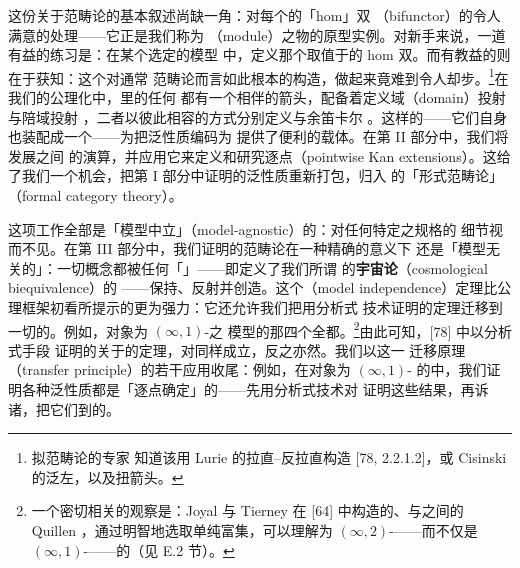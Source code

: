 这份关于\trInfinityCategory{}范畴论的基本叙述尚缺一角：对\trAdjunction{}每个\trInfinityCategory{}的「hom」双\trFunctor
（bifunctor）的令人满意的处理——它正是我们称为\textbf{\trModule}
（module）之物的原型实例。对新手来说，一道有益的练习是：在某个选定的模型
中，定义那个取值于\trInfinityGroupoid{}的 hom 双\trFunctor{}。而有教益的则在于获知：这个对通常
范畴论而言如此根本的构造，做起来竟难到令人却步。\footnote{拟范畴论的专家
知道该用 Lurie 的拉直–反拉直构造 [78, 2.2.1.2]，或 Cisinski 的泛左\trFibration
[28, 5.2.8]，以及扭箭头\trQuasiCategory{}。}在我们的公理化中，\trInfinityCosmos{}里的任何\trInfinityCategory
都有一个相伴的箭头\trInfinityCategory{}，配备着定义域（domain）投射\trFunctor{}与陪域投射%
\trFunctor{}，二者以彼此相容的方式分别定义\trCartesianFibration{}与余笛卡尔%
\trFibration{}。这样的\trModule——它们自身也装配成一个\trInfinityCosmos——为把泛性质编码为%
\trFibered{}\trEquivalence{}提供了便利的载体。在第 II 部分中，我们将发展\trInfinityCategory{}之间%
\trModule{}的演算，并应用它来定义和研究逐点\trKanExtension{}（pointwise Kan
extensions）。这给了我们一个机会，把第 I 部分中证明的泛性质重新打包，归入%
\trInfinityCategory{}的「形式范畴论」（formal category theory）。

这项工作全部是「模型中立」（model-agnostic）的：对任何特定\trInfinityCosmos{}之规格的
细节视而不见。在第 III 部分中，我们证明\trInfinityCategory{}的范畴论在一种精确的意义下
还是「模型无关的」：一切\trCategory{}概念都被任何「\trChangeOfModel」\trFunctor——即定义了我们所谓
的\textbf{宇宙论\trBiequivalence}（cosmological biequivalence）的\trFunctor
——保持、反射并创造。这个\textbf{\trModelIndependence}（model
independence）定理比公理框架初看所提示的更为强力：它还允许我们把用分析式
技术证明的定理迁移到一切\trBiequivalence{}的\trInfinityCosmos{}。例如，对象为 $(\infty,1)$-\trCategory{}之
模型的那四个\trInfinityCosmos{}全都\trBiequivalence{}。\footnote{一个密切相关的观察是：Joyal 与
Tierney 在 [64] 中构造的\trQuasiCategory{}、\trCompleteSegalSpaces{}与\trSegalCategories{}之间的 Quillen
\trEquivalence{}，通过明智地选取单纯富集，可以理解为 $(\infty,2)$-\trCategory——而不仅是
$(\infty,1)$-\trCategory——的\trEquivalence{}（见 E.2 节）。}由此可知，[78] 中以分析式手段
证明的关于\trQuasiCategory{}的定理，对\trCompleteSegalSpaces{}同样成立，反之亦然。我们以这一
迁移原理（transfer principle）的若干应用收尾：例如，在对象为 $(\infty,1)$-
\trCategory{}的\trInfinityCosmos{}中，我们证明各种泛性质都是「逐点确定」的——先用分析式技术对%
\trQuasiCategory{}证明这些结果，再诉诸\trModelIndependence{}，把它们\trExtension{}到\trBiequivalence{}的\trInfinityCosmos{}。

